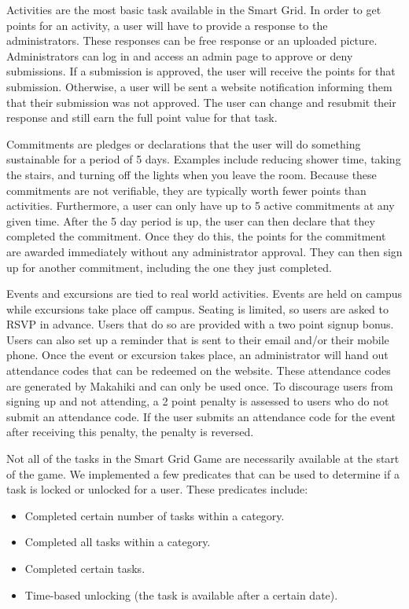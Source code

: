 \documentclass{acm_proc_article-sp}
\begin{document}
Activities are the most basic task available in the Smart Grid. In order to get points for an activity, a user will have to provide a response to the administrators. These responses can be free response or an uploaded picture. Administrators can log in and access an admin page to approve or deny submissions. If a submission is approved, the user will receive the points for that submission. Otherwise, a user will be sent a website notification informing them that their submission was not approved. The user can change and resubmit their response and still earn the full point value for that task.

Commitments are pledges or declarations that the user will do something sustainable for a period of 5 days. Examples include reducing shower time, taking the stairs, and turning off the lights when you leave the room. Because these commitments are not verifiable, they are typically worth fewer points than activities. Furthermore, a user can only have up to 5 active commitments at any given time. After the 5 day period is up, the user can then declare that they completed the commitment. Once they do this, the points for the commitment are awarded immediately without any administrator approval. They can then sign up for another commitment, including the one they just completed.

Events and excursions are tied to real world activities. Events are held on campus while excursions take place off campus. Seating is limited, so users are asked to RSVP in advance. Users that do so are provided with a two point signup bonus. Users can also set up a reminder that is sent to their email and/or their mobile phone. Once the event or excursion takes place, an administrator will hand out attendance codes that can be redeemed on the website. These attendance codes are generated by Makahiki and can only be used once. To discourage users from signing up and not attending, a 2 point penalty is assessed to users who do not submit an attendance code. If the user submits an attendance code for the event after receiving this penalty, the penalty is reversed.

Not all of the tasks in the Smart Grid Game are necessarily available at the start of the game. We implemented a few predicates that can be used to determine if a task is locked or unlocked for a user. These predicates include:

\begin{itemize}
  \item Completed certain number of tasks within a category.
  \item Completed all tasks within a category.
  \item Completed certain tasks.
  \item Time-based unlocking (the task is available after a certain date).
\end{itemize}
\end{document}
